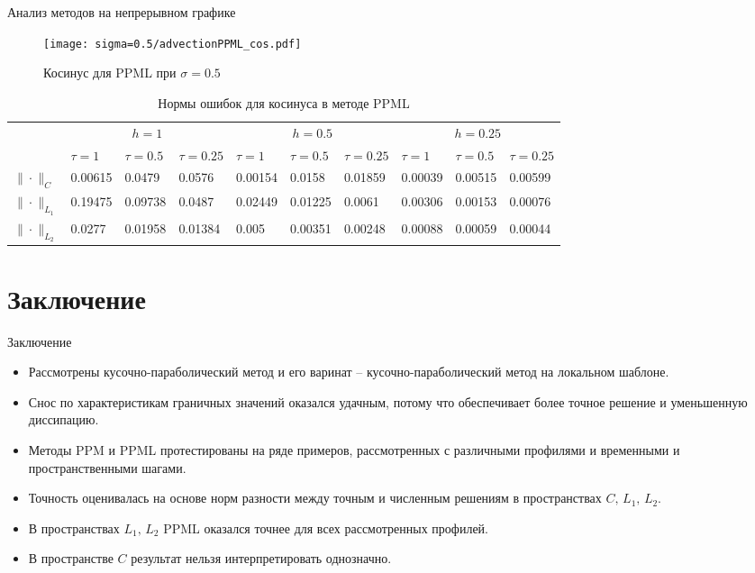 \documentclass[unicode, 8pt]{beamer}
\begin{document}
    \begin{frame}{Анализ методов на непрерывном графике}
        \begin{figure}[h]
            \centering
            \texttt{[image: sigma=0.5/advectionPPML\_cos.pdf]}
            \caption{Косинус для PPML при $ \sigma = 0.5 $}
            \label{fig:ppml_cos_05}
        \end{figure}
        \begin{table}[h]
            \centering
            \caption{Нормы ошибок для косинуса в методе PPML}
            \label{table:cosPPML}
            \scalebox{0.75} {
                \begin{tabular}{|*{10}{C{.45in}|}}
                    \hline
                    &  &  &  \\
                    & $\tau=1$ & $\tau=0.5$ & $\tau=0.25$ & $\tau=1$ & $\tau=0.5$ & $\tau=0.25$ & $\tau=1$ & $\tau=0.5$ & $\tau=0.25$ 
                    \\ \hline
                    $\| \cdot \|_{C}$ & 0.00615 & 0.0479 & 0.0576 & 0.00154 & 0.0158 & 0.01859 & 0.00039 & 0.00515 & 0.00599
                    \\ \hline
                    $\| \cdot \|_{L_1}$ & 0.19475 & 0.09738 & 0.0487 & 0.02449 & 0.01225 & 0.0061 & 0.00306 & 0.00153 & 0.00076
                    \\ \hline
                    $\| \cdot \|_{L_2}$ & 0.0277 & 0.01958 & 0.01384 & 0.005 & 0.00351 & 0.00248 & 0.00088 & 0.00059 & 0.00044
                    \\ \hline
                \end{tabular}
            }
        \end{table}
    \end{frame}

    \section{Заключение}
    \begin{frame}{Заключение}
        \begin{itemize}
            \item Рассмотрены кусочно-параболический метод и его варинат -- кусочно-параболический метод на локальном шаблоне.
            \item Снос по характеристикам граничных значений оказался удачным, потому что обеспечивает более точное решение и уменьшенную диссипацию.
            \item Методы PPM и PPML протестированы на ряде примеров, рассмотренных с различными профилями и временными и пространственными шагами.
            \item Точность оценивалась на основе норм разности между точным и численным решениям в пространствах $ C,\, L_1,\, L_2 $.
            \item В пространствах $L_1, \, L_2$ PPML оказался точнее для всех рассмотренных профилей. 
            \item В пространстве $C$ результат нельзя интерпретировать однозначно.
        \end{itemize}
    \end{frame}
\end{document}
